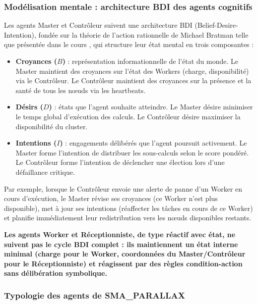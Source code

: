 \documentclass[12pt,a4paper]{report}
\begin{document}
\subsubsection{Modélisation mentale : architecture BDI des agents cognitifs}

Les agents Master et Contrôleur suivent une architecture BDI (Belief-Desire-Intention), fondée sur la théorie de l'action rationnelle de Michael Bratman telle que présentée dans le cours \cite{chapitre2}, qui structure leur état mental en trois composantes \cite{wooldridge} :

\begin{itemize}
    \item \textbf{Croyances ($B$)} : représentation informationnelle de l'état du monde. Le Master maintient des croyances sur l'état des Workers (charge, disponibilité) via le Contrôleur. Le Contrôleur maintient des croyances sur la présence et la santé de tous les nœuds via les heartbeats.
    \item \textbf{Désirs ($D$)} : états que l'agent souhaite atteindre. Le Master désire minimiser le temps global d'exécution des calculs. Le Contrôleur désire maximiser la disponibilité du cluster.
    \item \textbf{Intentions ($I$)} : engagements délibérés que l'agent poursuit activement. Le Master forme l'intention de distribuer les sous-calculs selon le score pondéré. Le Contrôleur forme l'intention de déclencher une élection lors d'une défaillance critique.
\end{itemize}

Par exemple, lorsque le Contrôleur envoie une alerte de panne d'un Worker en cours d'exécution, le Master révise ses croyances (ce Worker n'est plus disponible), met à jour ses intentions (réaffecter les tâches en cours de ce Worker) et planifie immédiatement leur redistribution vers les nœuds disponibles restants.

\textbf{\large Les agents Worker et Réceptionniste, de type réactif avec état, ne suivent pas le cycle BDI complet : ils maintiennent un état interne minimal (charge pour le Worker, coordonnées du Master/Contrôleur pour le Réceptionniste) et réagissent par des règles condition-action sans délibération symbolique.}

\subsubsection{Typologie des agents de SMA\_PARALLAX}
\end{document}
